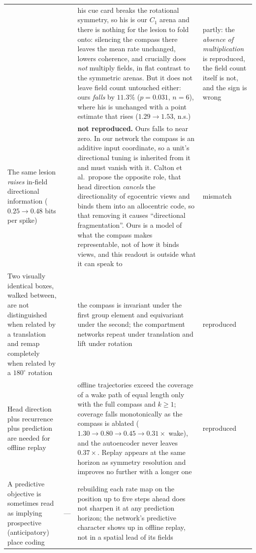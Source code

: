 \begin{table}[t]
\begin{tabular}{p{}p{}p{}p{}}
& \citet{calton2003} & his cue card breaks the rotational symmetry, so his is our $C_1$ arena and
there is nothing for the lesion to fold onto: silencing the compass there leaves the mean rate
unchanged, lowers coherence, and crucially does \emph{not} multiply fields, in flat contrast to the
symmetric arenas. But it does not leave field count untouched either: ours \emph{falls} by
$11.3\%$ ($p = 0.031$, $n = 6$), where his is unchanged with a point estimate that rises
($1.29 \to 1.53$, n.s.)
& partly: the \emph{absence of multiplication} is reproduced, the field count itself is not,
and the sign is wrong \\[4pt]
The same lesion \emph{raises} in-field directional information ($0.25 \to 0.48$ bits per spike)
& \citet{calton2003} & \textbf{not reproduced.} Ours falls to near zero. In our network the compass
is an additive input coordinate, so a unit's directional tuning is inherited from it and must vanish
with it. Calton et al.\ propose the opposite role, that head direction \emph{cancels} the
directionality of egocentric views and binds them into an allocentric code, so that removing it
causes ``directional fragmentation''. Ours is a model of what the compass makes representable, not
of how it binds views, and this readout is outside what it can speak to
& mismatch \\[4pt]
Two visually identical boxes, walked between, are not distinguished when related by a translation
and remap completely when related by a $180^\circ$ rotation
& \citet{fuhs2005} & the compass is invariant under the first group element and equivariant under
the second; the compartment networks repeat under translation and lift under rotation
& reproduced \\[4pt]
Head direction plus recurrence plus prediction are needed for offline replay
& \citet{levenstein2024} & offline trajectories exceed the coverage of a wake path of equal
length only with the full compass and $k \ge 1$; coverage falls monotonically as the compass
is ablated ($1.30 \to 0.80 \to 0.45 \to 0.31 \times$ wake), and the autoencoder never leaves
$0.37\times$. Replay appears at the same horizon as symmetry resolution and improves no
further with a longer one
& reproduced \\[4pt]
A predictive objective is sometimes read as implying prospective (anticipatory) place coding
& --- & rebuilding each rate map on the position up to five steps ahead does not sharpen it at
any prediction horizon; the network's predictive character shows up in offline replay, not in a
spatial lead of its fields

\end{tabular}
\end{table}
